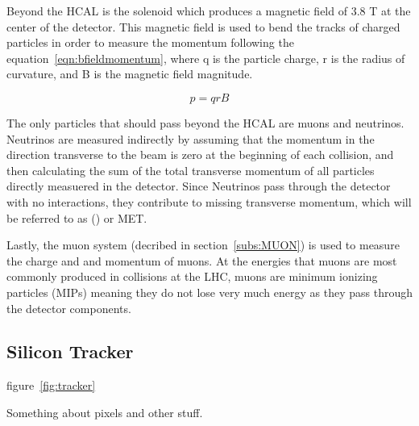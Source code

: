 Beyond the HCAL is the solenoid which produces a magnetic field of 3.8 T at the center of the detector.
This magnetic field is used to bend the tracks of charged particles in order to measure the momentum following the equation~\ref{eqn:bfieldmomentum},
where q is the particle charge, r is the radius of curvature, and B is the magnetic field magnitude.

\begin{equation}
  \label{eqn:bfieldmomentum}
p = qrB
\end{equation}

The only particles that should pass beyond the HCAL are muons and neutrinos.
Neutrinos are measured indirectly by assuming that the momentum in the direction transverse to the beam is zero at the beginning of each collision,
and then calculating the sum of the total transverse momentum of all particles directly measuered in the detector.
Since Neutrinos pass through the detector with no interactions, they contribute to missing transverse momentum, which will be referred to as (\MET) or MET.

Lastly, the muon system (decribed in section~\ref{subs:MUON}) is used to measure the charge and and momentum of muons.
At the energies that muons are most commonly produced in collisions at the LHC, muons are minimum ionizing particles (MIPs)
meaning they do not lose very much energy as they pass through the detector components.

\subsection{Silicon Tracker}
\label {subs:tracker}
figure~\ref{fig:tracker}

Something about pixels and other stuff.

